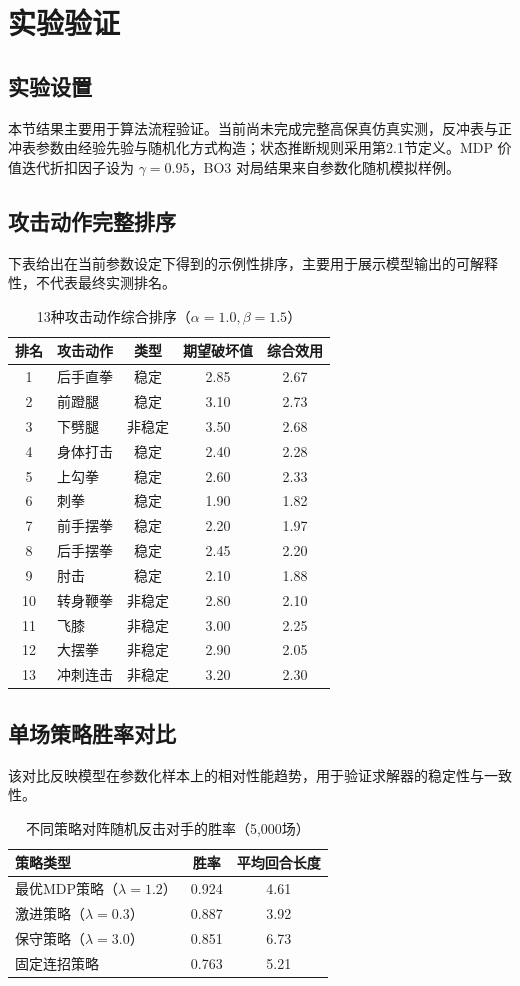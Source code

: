 \section{实验验证}
\subsection{实验设置}
本节结果主要用于算法流程验证。当前尚未完成完整高保真仿真实测，反冲表与正冲表参数由经验先验与随机化方式构造；状态推断规则采用第2.1节定义。MDP 价值迭代折扣因子设为 $\gamma=0.95$，BO3 对局结果来自参数化随机模拟样例。

\subsection{攻击动作完整排序}
下表给出在当前参数设定下得到的示例性排序，主要用于展示模型输出的可解释性，不代表最终实测排名。
\begin{longtable}{c l c c c}
\caption{13种攻击动作综合排序（$\alpha=1.0, \beta=1.5$）}\\
\toprule
排名 & 攻击动作 & 类型 & 期望破坏值 & 综合效用 \\
\midrule
1 & 后手直拳 & 稳定 & 2.85 & 2.67 \\
2 & 前蹬腿 & 稳定 & 3.10 & 2.73 \\
3 & 下劈腿 & 非稳定 & 3.50 & 2.68 \\
4 & 身体打击 & 稳定 & 2.40 & 2.28 \\
5 & 上勾拳 & 稳定 & 2.60 & 2.33 \\
6 & 刺拳 & 稳定 & 1.90 & 1.82 \\
7 & 前手摆拳 & 稳定 & 2.20 & 1.97 \\
8 & 后手摆拳 & 稳定 & 2.45 & 2.20 \\
9 & 肘击 & 稳定 & 2.10 & 1.88 \\
10 & 转身鞭拳 & 非稳定 & 2.80 & 2.10 \\
11 & 飞膝 & 非稳定 & 3.00 & 2.25 \\
12 & 大摆拳 & 非稳定 & 2.90 & 2.05 \\
13 & 冲刺连击 & 非稳定 & 3.20 & 2.30 \\
\bottomrule
\end{longtable}

\subsection{单场策略胜率对比}
该对比反映模型在参数化样本上的相对性能趋势，用于验证求解器的稳定性与一致性。
\begin{table}[H]
\centering
\caption{不同策略对阵随机反击对手的胜率（5,000场）}
\begin{tabular}{l c c}
\toprule
策略类型 & 胜率 & 平均回合长度 \\
\midrule
最优MDP策略（$\lambda=1.2$） & 0.924 & 4.61 \\
激进策略（$\lambda=0.3$） & 0.887 & 3.92 \\
保守策略（$\lambda=3.0$） & 0.851 & 6.73 \\
固定连招策略 & 0.763 & 5.21 \\
\bottomrule
\end{tabular}
\end{table}

